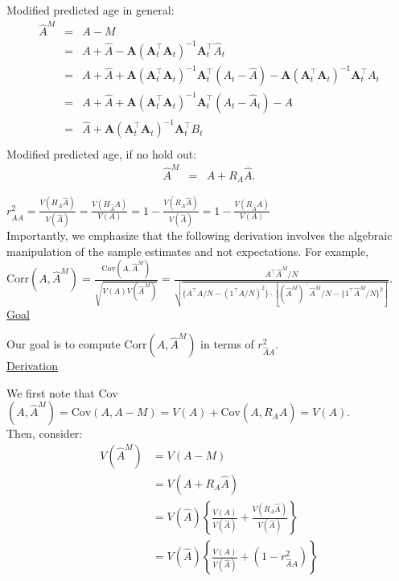\documentclass[40pt]{article}
\begin{document}
Modified predicted age in general:
\begin{eqnarray}
  \hat{A}^M &=& A - M\\
  &=&A +\hat{A} - \mathbf{A}(\mathbf{A}_t^\top \mathbf{A}_t)^{-1}\mathbf{A}_t^\top\hat{A}_t\\
  &=&A +\hat{A} + \mathbf{A}(\mathbf{A}_t^\top \mathbf{A}_t)^{-1}\mathbf{A}_t^\top(A_t-\hat{A})-\mathbf{A}(\mathbf{A}_t^\top \mathbf{A}_t)^{-1}\mathbf{A}_t^\top A_t\\
  &=&A +\hat{A} + \mathbf{A}(\mathbf{A}_t^\top \mathbf{A}_t)^{-1}\mathbf{A}_t^\top(A_t-\hat{A}_t)-A\\
  &=&\hat{A} + \mathbf{A}(\mathbf{A}_t^\top \mathbf{A}_t)^{-1}\mathbf{A}_t^\top B_t\\
\end{eqnarray}
Modified predicted age, if no hold out:
\begin{eqnarray}
  \hat{A}^M&=& A+R_A \hat{A}.
\end{eqnarray}

$r_{\hat{A}A}^2 = \frac{V(H_A \hat{A})}{V(\hat{A})} = \frac{V(H_{\hat{A}} A)}{V(A)} = 1 - \frac{V(R_A \hat{A})}{V(\hat{A})} = 1 - \frac{V(R_{\hat{A}} A)}{V(A)}$ \\ %

Importantly, we emphasize that the following derivation involves the algebraic manipulation of the sample estimates and not expectations. For example, ${\textrm{Corr}}(A, \hat{A}^M) = \frac{\textrm{Cov}(A, \hat{A}^M)}{\sqrt{V(A)V(\hat{A}^M)}} = \frac{A^{\top}\hat{A}^M/N} {\sqrt{\{A^{\top}A/N-(1^{\top}A/N)^2\}\cdot [(\hat{A}^M)^{\top}\hat{A}^M/N-\{1^{\top}\hat{A}^M/N\}^2]}}$.
\\

\underline{Goal}

Our goal is to compute ${\textrm{Corr}}(A, \hat{A}^M)$ in terms of $r_{\hat{A}A}^2$. \\

\underline{Derivation}

We first note that Cov$(A, \hat{A}^M) = \text{Cov}(A, A-M) = V(A) + \text{Cov}(A, R_A \hat{A}) = V(A)$. \\

Then, consider:
\begin{align*}
V(\hat{A}^M) &= V(A - M) \\
&= V(A + R_A \hat{A}) \\
&= V(\hat{A}) \left\{\frac{V(A)}{V(\hat{A})} + \frac{V(R_A \hat{A})}{V(\hat{A})}\right\} \\
&= V(\hat{A}) \left\{\frac{V(A)}{V(\hat{A})} + (1 - r_{\hat{A}A}^2) \right\} \\
\end{align*}
\end{document}
